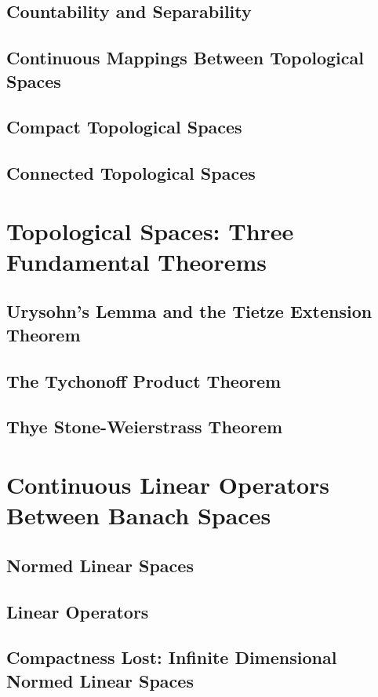 \documentclass[a4paper,10pt]{book}
\theoremstyle{plain} %
\begin{document}
\section{Countability and Separability}
\section{Continuous Mappings Between Topological Spaces}
\section{Compact Topological Spaces}
\section{Connected Topological Spaces}

\chapter{Topological Spaces: Three Fundamental Theorems}

\section{Urysohn's Lemma and the Tietze Extension Theorem}
\section{The Tychonoff Product Theorem}
\section{Thye Stone-Weierstrass Theorem}

\chapter{Continuous Linear Operators Between Banach Spaces}

\section{Normed Linear Spaces}
\section{Linear Operators}
\section{Compactness Lost: Infinite Dimensional Normed Linear Spaces}
\end{document}

